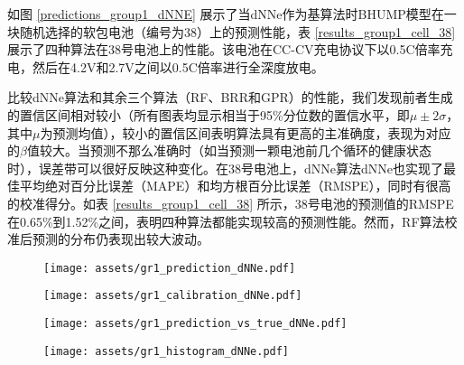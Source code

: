 \documentclass{article}
\begin{document}
如图 \ref{predictions_group1_dNNE} 展示了当dNNe作为基算法时BHUMP模型在一块随机选择的软包电池（编号为38）上的预测性能，表 \ref{results_group1_cell_38} 展示了四种算法在38号电池上的性能。该电池在CC-CV充电协议下以0.5C倍率充电，然后在4.2V和2.7V之间以0.5C倍率进行全深度放电。

比较dNNe算法和其余三个算法（RF、BRR和GPR）的性能，我们发现前者生成的置信区间相对较小（所有图表均显示相当于95\%分位数的置信水平，即$\mu±2\sigma$，其中$\mu$为预测均值），较小的置信区间表明算法具有更高的主准确度，表现为对应的$\beta$值较大。当预测不那么准确时（如当预测一颗电池前几个循环的健康状态时），误差带可以很好反映这种变化。在38号电池上，dNNe算法dNNe也实现了最佳平均绝对百分比误差（MAPE）和均方根百分比误差（RMSPE），同时有很高的校准得分。如表 \ref{results_group1_cell_38} 所示，38号电池的预测值的RMSPE在0.65\%到1.52\%之间，表明四种算法都能实现较高的预测性能。然而，RF算法校准后预测的分布仍表现出较大波动。

\begin{figure*}[h!]
  \centering
\begin{subfigure}[b]{.55\textwidth}
     \centering
     \caption{}
                    \texttt{[image: assets/gr1\_prediction\_dNNe.pdf]}
     \label{pred_group1_dNNe}
\end{subfigure}%
\begin{subfigure}[b]{.3\textwidth}
     \centering
     \caption{}
                    \texttt{[image: assets/gr1\_calibration\_dNNe.pdf]}
     \label{calibration_group1_dNNE}
  \end{subfigure}%
  \hfill 
  \begin{subfigure}[b]{.55\textwidth}
     \centering
     \caption{}
                    \texttt{[image: assets/gr1\_prediction\_vs\_true\_dNNe.pdf]}
     \label{prediction_vs_true_dNNe_group1}
\end{subfigure}%
\begin{subfigure}[b]{.3\textwidth}
     \centering
     \caption{}
                    \texttt{[image: assets/gr1\_histogram\_dNNe.pdf]}
     \label{hist_group1_dNNE}
  \end{subfigure}%
    \hfill
  \caption{\textbf{dNNe作为基算法在38号电池上的预测结果} \textbf{\protect{}} dNNe预测的容量-时间曲线，\textbf{\protect{}} dNNE算法标定结果, \textbf{\protect{}} dNNe预测值和真实值对照, \textbf{\protect{}} 百分比误差柱状图（其中$y^*$为真实容量，$\hat{y}^*$为预测容量）。} 
  \label{predictions_group1_dNNE}
 \end{figure*}
\end{document}
